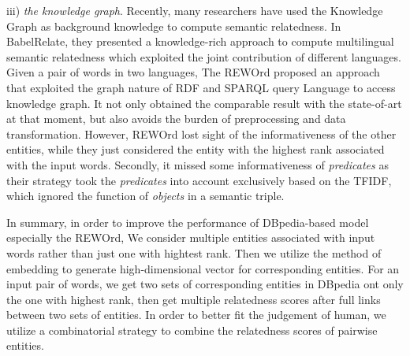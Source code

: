iii) \emph{the knowledge graph}. 
Recently, many researchers have used the Knowledge Graph as background knowledge to compute semantic relatedness.
In BabelRelate\cite{aaai/NavigliP12}, they presented a knowledge-rich approach to compute multilingual semantic
relatedness which exploited the joint contribution of different languages. Given a pair of words in two languages,
The REWOrd\cite{aaai/Pirro12} proposed an approach that exploited the graph nature of RDF and SPARQL query
Language to access knowledge graph. It not only obtained the comparable result with the state-of-art at that moment,
but also avoids the burden of preprocessing and data transformation.
However, REWOrd lost sight of the informativeness of the other entities, while they just
considered the entity with the highest rank associated with the input words.
Secondly, it missed some informativeness of \emph{predicates} as their strategy took
the \emph{predicates} into account exclusively based on the TFIDF, which ignored the function of \emph{objects} in a semantic triple.

In summary, in order to improve the performance of DBpedia-based model especially the REWOrd,
We consider multiple entities associated with input words rather than just one with hightest rank.
Then we utilize the method of embedding to generate high-dimensional vector for corresponding entities.
For an input pair of words, we get two sets of corresponding entities in DBpedia ont only the one with highest rank,
then get multiple relatedness scores after full links between two sets of entities.
In order to better fit the judgement of human, we utilize a combinatorial strategy to combine
the relatedness scores of pairwise entities.

